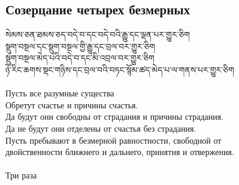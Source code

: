 \subsection{Созерцание четырех безмерных}
\vspace{0.5cm}
\ti
སེམས་ཅན་ཐམས་ཅད་བདེ་བ་དང་བདེ་བའི་རྒྱུ་དང་ལྡན་པར་གྱུར་ཅིག\\
སྡུག་བསྔལ་དང་སྡུག་བསྔལ་གྱི་རྒྱུ་དང་བྲལ་བར་གྱུར་ཅིག\\
སྡུག་བསྔལ་མེད་པའི་བདེ་བ་དང་མི་འབྲལ་བར་གྱུར་ཅིག\\
ཉེ་རིང་ཆགས་སྡང་གཉིས་དང་བྲལ་བའི་བཏང་སྙོམ་ཚད་མེད་པ་ལ་གནས་པར་གྱུར་ཅིག\\
\\
\ru
Пусть все разумные существа\\
Обретут счастье и причины счастья.\\
Да будут они свободны от страдания и причины страдания.\\
Да не будут они отделены от счастья без страдания.\\
Пусть пребывают в безмерной равностности, свободной от\\
двойственности ближнего и дальнего, принятия и отвержения.\\
\\
Три раза

\newpage
